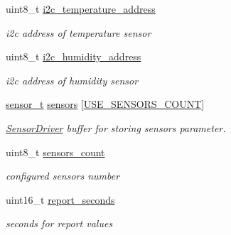 \begin{DoxyCompactItemize}
\mbox{\label{structconfiguration__t_aed0a51c0dfbd925368c8539cf10c3001}} 
uint8\+\_\+t \hyperlink{structconfiguration__t_aed0a51c0dfbd925368c8539cf10c3001}{i2c\+\_\+temperature\+\_\+address}
\begin{DoxyCompactList}\small\item\em i2c address of temperature sensor \end{DoxyCompactList}\item 
\mbox{\label{structconfiguration__t_a79d1b1d9cb095c2bc0deb36c4f44452c}} 
uint8\+\_\+t \hyperlink{structconfiguration__t_a79d1b1d9cb095c2bc0deb36c4f44452c}{i2c\+\_\+humidity\+\_\+address}
\begin{DoxyCompactList}\small\item\em i2c address of humidity sensor \end{DoxyCompactList}\item 
\mbox{\label{structconfiguration__t_adede74f3da6d26f5bc4b5e64e4776f7f}} 
\hyperlink{structsensor__t}{sensor\+\_\+t} \hyperlink{structconfiguration__t_adede74f3da6d26f5bc4b5e64e4776f7f}{sensors} \mbox{[}\hyperlink{rmap-config_8h_af18dc3de744722cb308451b7a705611b}{U\+S\+E\+\_\+\+S\+E\+N\+S\+O\+R\+S\+\_\+\+C\+O\+U\+NT}\mbox{]}
\begin{DoxyCompactList}\small\item\em \hyperlink{classSensorDriver}{Sensor\+Driver} buffer for storing sensors parameter. \end{DoxyCompactList}\item 
\mbox{\label{structconfiguration__t_a9a1e7c702c2dd7270f31aca29264db86}} 
uint8\+\_\+t \hyperlink{structconfiguration__t_a9a1e7c702c2dd7270f31aca29264db86}{sensors\+\_\+count}
\begin{DoxyCompactList}\small\item\em configured sensors number \end{DoxyCompactList}\item 
\mbox{\label{structconfiguration__t_a0c0dc512cf86464d2e8dad486e042c5c}} 
uint16\+\_\+t \hyperlink{structconfiguration__t_a0c0dc512cf86464d2e8dad486e042c5c}{report\+\_\+seconds}
\begin{DoxyCompactList}\small\item\em seconds for report values \end{DoxyCompactList}\item 

\end{DoxyCompactItemize}
